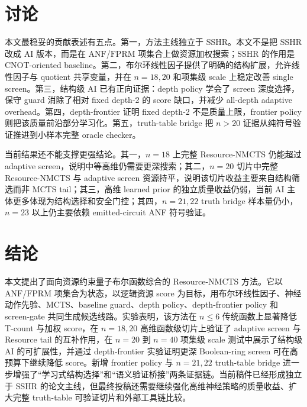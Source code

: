 \documentclass[UTF8,fontset=macnew,11pt]{ctexart}
\newcommand{\method}{Resource-NMCTS}
\newcommand{\anf}{\ensuremath{\mathrm{ANF}}}
\newcommand{\fprm}{\ensuremath{\mathrm{FPRM}}}
\newcommand{\mcts}{\ensuremath{\mathrm{MCTS}}}
\newcommand{\ttable}{truth-table}
\begin{document}
\section{讨论}

本文最稳妥的贡献表述有五点。第一，方法主线独立于 SSHR。本文不是把 SSHR 改成 AI 版本，而是在 \anf{}/\fprm{} 项集合上做资源加权搜索；SSHR 的作用是 CNOT-oriented baseline。第二，布尔环线性因子提供了明确的结构扩展，允许线性因子与 quotient 共享变量，并在 $n=18,20$ 和项集级 scale 上稳定改善 single screen。第三，结构级 AI 已有正向证据：depth policy 学会了 screen 深度选择，保守 guard 消除了相对 fixed depth-2 的 score 缺口，并减少 all-depth adaptive overhead。第四，depth-frontier 证明 fixed depth-2 不是质量上限，frontier policy 则把该质量前沿部分学习化。第五，truth-table bridge 把 $n>20$ 证据从纯符号验证推进到小样本完整 oracle checker。

当前结果还不能支撑更强结论。其一，$n=18$ 上完整 \method{} 仍能超过 adaptive screen，说明中等高维仍需要更深搜索；其二，$n=20$ 切片中完整 \method{} 与 adaptive screen 资源持平，说明该切片收益主要来自结构筛选而非 MCTS tail；其三，高维 learned prior 的独立质量收益仍弱，当前 AI 主体更多体现为结构选择和安全门控；其四，$n=21,22$ truth bridge 样本量仍小，$n=23$ 以上仍主要依赖 emitted-circuit ANF 符号验证。

\section{结论}

本文提出了面向资源约束量子布尔函数综合的 \method{} 方法。它以 \anf{}/\fprm{} 项集合为状态，以逻辑资源 score 为目标，用布尔环线性因子、神经动作先验、\mcts{}、baseline guard、depth policy、depth-frontier policy 和 screen-gate 共同生成候选线路。实验表明，该方法在 $n\leq6$ 传统函数上显著降低 T-count 与加权 score，在 $n=18,20$ 高维函数级切片上验证了 adaptive screen 与 Resource tail 的互补作用，在 $n=20$ 到 $n=40$ 项集级 scale 测试中展示了结构级 AI 的可扩展性，并通过 depth-frontier 实验证明更深 Boolean-ring screen 可在高预算下继续降低 score。新增 frontier policy 与 $n=21,22$ truth-table bridge 进一步增强了“学习式结构选择”和“语义验证桥接”两条证据链。当前稿件已经形成独立于 SSHR 的论文主线，但最终投稿还需要继续强化高维神经策略的质量收益、扩大完整 \ttable{} 可验证切片和外部工具链比较。
\end{document}
